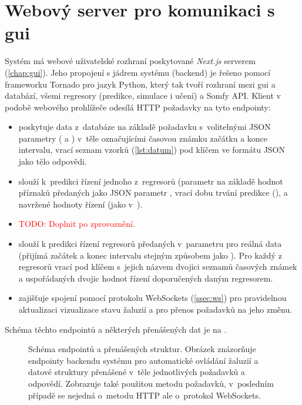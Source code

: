   \section{Webový server pro komunikaci s \acrshort{gui}}
    Systém má webové uživatelské rozhraní poskytované \emph{Next.js} serverem (\cref{chap:gui}). Jeho propojení s jádrem systému (backend) je řešeno pomocí frameworku Tornado pro jazyk Python, který tak tvoří rozhraní mezi \acrshort{gui} a databází, všemi regresory (predikce, simulace i učení) a Somfy API. Klient v podobě webového prohlížeče odesílá HTTP požadavky na tyto endpointy: 
    \begin{itemize}
      \item {} poskytuje data z~databáze na základě  požadavku s~volitelnými JSON parametry ( a ) v~těle označujícími časovou známku začátku a konce intervalu, vrací seznam vzorků (\cref{lst:datum}) pod klíčem  ve formátu JSON jako tělo odpovědi.
      \item {} slouží k~predikci řízení jednoho z~regresorů (parametr  na základě hodnot příznaků předaných jako JSON parametr , vrací dobu trvání predikce (),  a navržené hodnoty řízení (jako v~).
      \item {} \textcolor{red}{TODO: Doplnit po zprovoznění}.
      \item {} slouží k predikci řízení regresorů předaných v~parametru  pro reálná data (přijímá začátek a konec intervalu stejným způsobem jako ). Pro každý z regresorů vrací pod klíčem s~jejich názvem dvojici seznamů časových známek a uspořádaných dvojic hodnot řízení doporučených daným regresorem.
      \item {} zajišťuje spojení pomocí protokolu WebSockets (\cref{ssec:ws}) pro pravidelnou aktualizaci vizualizace stavu žaluzií a pro přenos požadavků na jeho změnu.
    \end{itemize}
    Schéma těchto endpointů a některých přenášených dat je na .
    
    \begin{figure}
      \centering
      
      \caption[Schéma endpointů a přenášených struktur]{Schéma endpointů a přenášených struktur. Obrázek znázorňuje endpointy backendu systému pro automatické ovládání žaluzií a datové struktury přenášené v~těle jednotlivých  požadavků a odpovědí. Zobrazuje také použitou metodu požadavků, v~posledním případě se nejedná o~metodu HTTP ale o~protokol WebSockets.}
      \label{fig:endpoints}
    \end{figure}